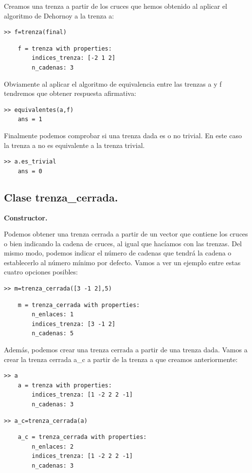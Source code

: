 Creamos una trenza a partir de los cruces que hemos obtenido al aplicar el algoritmo de Dehornoy a la trenza a:
\begin{lstlisting}
>> f=trenza(final)
\end{lstlisting}
\begin{lstlisting}
	f = trenza with properties:
	    indices_trenza: [-2 1 2]
	    n_cadenas: 3
\end{lstlisting}

Obviamente al aplicar el algoritmo de equivalencia entre las trenzas a y f tendremos que obtener respuesta afirmativa:
\begin{lstlisting}
>> equivalentes(a,f)
	ans = 1
\end{lstlisting}

Finalmente podemos comprobar si una trenza dada es o no trivial. En este caso la trenza a no es equivalente a la trenza trivial. 
\begin{lstlisting}
>> a.es_trivial
	ans = 0
\end{lstlisting}

\subsection{Clase trenza\_cerrada.}

\begin{center}
	\textbf{Constructor.}
\end{center}
Podemos obtener una trenza cerrada a partir de un vector que contiene los cruces o bien indicando la cadena de cruces, al igual que hacíamos con las trenzas. Del mismo modo, podemos indicar el número de cadenas que tendrá la cadena o establecerlo al número mínimo por defecto. Vamos a ver un ejemplo entre estas cuatro opciones posibles:
\begin{lstlisting}
>> m=trenza_cerrada([3 -1 2],5)
\end{lstlisting}
\begin{lstlisting}
	m = trenza_cerrada with properties:
	    n_enlaces: 1
	    indices_trenza: [3 -1 2]
	    n_cadenas: 5
\end{lstlisting}

Además, podemos crear una trenza cerrada a partir de una trenza dada. Vamos a crear la trenza cerrada a\_c a partir de la trenza a que creamos anteriormente:
\begin{lstlisting}
>> a
	a = trenza with properties:
	    indices_trenza: [1 -2 2 2 -1]
	    n_cadenas: 3
\end{lstlisting}
\begin{lstlisting}
>> a_c=trenza_cerrada(a)
\end{lstlisting}
\begin{lstlisting}	    
	a_c = trenza_cerrada with properties:	    
	    n_enlaces: 2
	    indices_trenza: [1 -2 2 2 -1]
	    n_cadenas: 3
\end{lstlisting}

